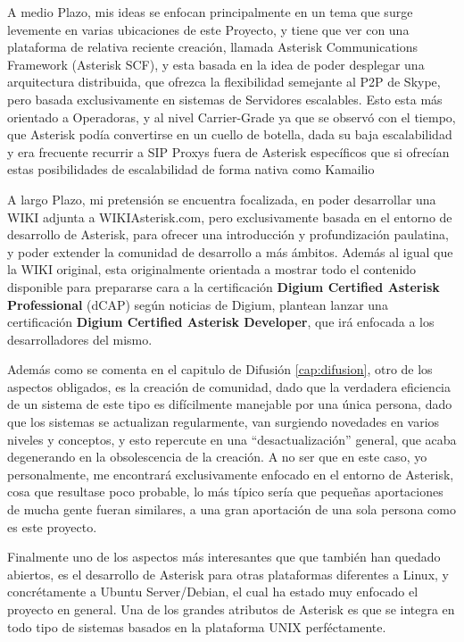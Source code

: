 A medio Plazo, mis ideas se enfocan principalmente en un tema que surge levemente en varias ubicaciones de este Proyecto, y tiene que ver con una plataforma de relativa reciente creación, llamada Asterisk Communications Framework (Asterisk SCF), y esta basada en la idea de poder desplegar una arquitectura distribuida, que ofrezca la flexibilidad semejante al P2P de Skype, pero basada exclusivamente en sistemas de Servidores escalables. Esto esta más orientado a Operadoras, y al nivel Carrier-Grade \cite{website:carriergrade} ya que se observó con el tiempo, que Asterisk podía convertirse en un cuello de botella, dada su baja escalabilidad y era frecuente recurrir a SIP Proxys \cite{goncalves10} fuera de Asterisk específicos que si ofrecían estas posibilidades de escalabilidad de forma nativa como Kamailio \cite{website:kamailio}

A largo Plazo, mi pretensión se encuentra focalizada, en poder desarrollar una WIKI adjunta a WIKIAsterisk.com, pero exclusivamente basada en el entorno de desarrollo de Asterisk, para ofrecer una introducción y profundización paulatina, y poder extender la comunidad de desarrollo a más ámbitos. Además al igual que la WIKI original, esta originalmente orientada a mostrar todo el contenido disponible para prepararse cara a la certificación \textbf{Digium Certified Asterisk Professional} (dCAP) según noticias de Digium, plantean lanzar una certificación \textbf{Digium Certified Asterisk Developer}, que irá enfocada a los desarrolladores del mismo.

Además como se comenta en el capitulo de Difusión \ref{cap:difusion}, otro de los aspectos obligados, es la creación de comunidad, dado que la verdadera eficiencia de un sistema de este tipo es difícilmente manejable por una única persona, dado que los sistemas se actualizan regularmente, van surgiendo novedades en varios niveles y conceptos, y esto repercute en una ``desactualización'' general, que acaba degenerando en la obsolescencia de la creación. A no ser que en este caso, yo personalmente, me encontrará exclusivamente enfocado en el entorno de Asterisk, cosa que resultase poco probable, lo más típico sería que pequeñas aportaciones de mucha gente fueran similares, a una gran aportación de una sola persona como es este proyecto.

Finalmente uno de los aspectos más interesantes que que también han quedado abiertos, es el desarrollo de Asterisk para otras plataformas diferentes a Linux, y concrétamente a Ubuntu Server/Debian, el cual ha estado muy enfocado el proyecto en general. Una de los grandes atributos de Asterisk es que se integra en todo tipo de sistemas basados en la plataforma UNIX perféctamente.